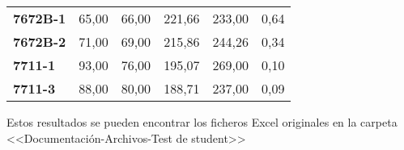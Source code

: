 \begin{table}[]
\begin{tabular}{@{} lrrrrr @{}}
\textbf{7672B-1}                 & 65,00                    & 66,00               & 221,66                   & 233,00              & 0,64                               \\ 
\textbf{7672B-2}                 & 71,00                    & 69,00               & 215,86                   & 244,26              & 0,34                               \\ 
\textbf{7711-1}                  & 93,00                    & 76,00               & 195,07                   & 269,00              & 0,10                               \\ 
\textbf{7711-3}                  & 88,00                    & 80,00               & 188,71                   & 237,00              & 0,09                               \\ \bottomrule
\end{tabular}
\end{table}
Estos resultados se pueden encontrar los ficheros Excel originales en la carpeta <<Documentación-Archivos-Test de student>>